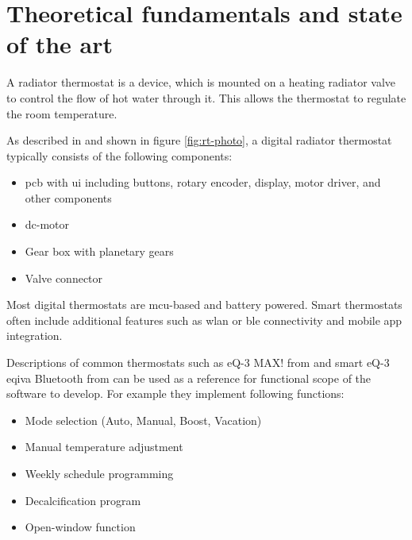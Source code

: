 %
%

\chapter{Theoretical fundamentals and state of the art}
\label{chap:Theoretical fundamentals and state of the art}
%
A radiator thermostat is a device, which is mounted on a heating radiator valve to control the flow of hot water through it. This allows the thermostat to regulate the room temperature.

As described in \cite{ELVjournal.2012} and shown in figure \ref{fig:rt-photo}, a digital radiator thermostat typically consists of the following components:

\begin{itemize}
	\item \acs{pcb} with \ac{ui} including buttons, rotary encoder, display, motor driver, and other components
	\item \ac{dc}-motor
	\item Gear box with planetary gears
	\item Valve connector
\end{itemize}

Most digital thermostats are \ac{mcu}-based and battery powered. Smart thermostats often include additional features such as \ac{wlan} or \ac{ble} connectivity and mobile app integration. 

Descriptions of common thermostats such as eQ-3 MAX! from \cite{ELVjournal.2012} and smart eQ-3 eqiva Bluetooth from \cite{eQ3AG.05.2018} can be used as a reference for functional scope of the software to develop. For example they implement following functions:

\begin{itemize}
	\item Mode selection (Auto, Manual, Boost, Vacation)
	\item Manual temperature adjustment
	\item Weekly schedule programming
	\item Decalcification program
	\item Open-window function
\end{itemize}


